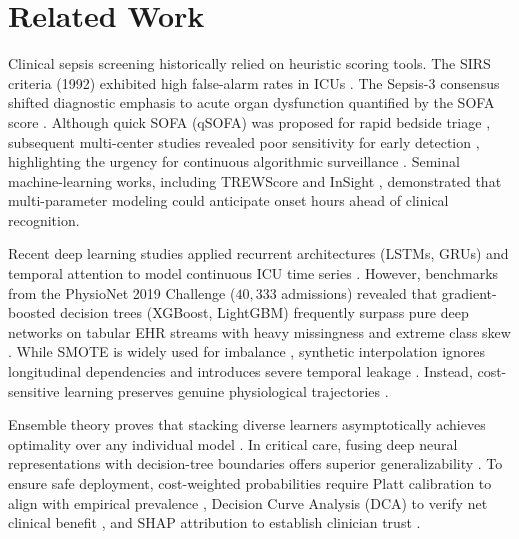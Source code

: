 \documentclass[conference]{IEEEtran}
\begin{document}
\section{Related Work}
Clinical sepsis screening historically relied on heuristic scoring tools. The SIRS criteria (1992) exhibited high false-alarm rates in ICUs \cite{bone1992sirs}. The Sepsis-3 consensus shifted diagnostic emphasis to acute organ dysfunction quantified by the SOFA score \cite{singer2016sepsis3, vincent1996sofa}. Although quick SOFA (qSOFA) was proposed for rapid bedside triage \cite{seymour2016qsofa}, subsequent multi-center studies revealed poor sensitivity for early detection \cite{churpek2017qsofa, finkelsztejn2017qsofa}, highlighting the urgency for continuous algorithmic surveillance \cite{evans2021surviving, kumar2006duration}. Seminal machine-learning works, including TREWScore \cite{henry2015trewscore} and InSight \cite{calvert2016insight}, demonstrated that multi-parameter modeling could anticipate onset hours ahead of clinical recognition.

Recent deep learning studies applied recurrent architectures (LSTMs, GRUs) and temporal attention to model continuous ICU time series \cite{lipo2016lstm, futoma2017comparison, choi2016doctorai, song2018sand, vaswani2017attention}. However, benchmarks from the PhysioNet 2019 Challenge ($40,333$ admissions) revealed that gradient-boosted decision trees (XGBoost, LightGBM) frequently surpass pure deep networks on tabular EHR streams with heavy missingness and extreme class skew \cite{reyna2020physionet, chen2016xgboost, ke2017lightgbm, yang2020physionet, zabihi2020sepsis}. While SMOTE is widely used for imbalance \cite{chawla2002smote}, synthetic interpolation ignores longitudinal dependencies and introduces severe temporal leakage \cite{blagus2013smote, he2009learning}. Instead, cost-sensitive learning preserves genuine physiological trajectories \cite{elkan2001cost, lin2017focal}.

Ensemble theory proves that stacking diverse learners asymptotically achieves optimality over any individual model \cite{wolpert1992stacked, breiman1996stacked, vanderLaan2007superlearner, polley2010superlearner}. In critical care, fusing deep neural representations with decision-tree boundaries offers superior generalizability \cite{rajkomar2018deep, komorowski2018artificial}. To ensure safe deployment, cost-weighted probabilities require Platt calibration to align with empirical prevalence \cite{platt1999probabilistic, niculescu2005predicting}, Decision Curve Analysis (DCA) to verify net clinical benefit \cite{vickers2006decision, vickers2016extensions}, and SHAP attribution to establish clinician trust \cite{lundberg2017shap, lundberg2020local}.
\end{document}
